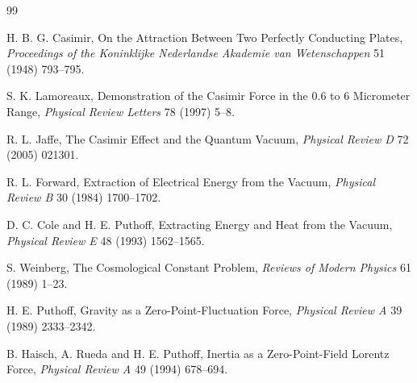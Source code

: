\documentclass[11pt]{article}
\begin{document}
\begin{thebibliography}{99}

 H. B. G. Casimir, On the Attraction Between Two Perfectly Conducting Plates, \emph{Proceedings of the Koninklijke Nederlandse Akademie van Wetenschappen} 51 (1948) 793--795.

 S. K. Lamoreaux, Demonstration of the Casimir Force in the 0.6 to 6 Micrometer Range, \emph{Physical Review Letters} 78 (1997) 5--8.

 R. L. Jaffe, The Casimir Effect and the Quantum Vacuum, \emph{Physical Review D} 72 (2005) 021301.

 R. L. Forward, Extraction of Electrical Energy from the Vacuum, \emph{Physical Review B} 30 (1984) 1700--1702.

 D. C. Cole and H. E. Puthoff, Extracting Energy and Heat from the Vacuum, \emph{Physical Review E} 48 (1993) 1562--1565.

 S. Weinberg, The Cosmological Constant Problem, \emph{Reviews of Modern Physics} 61 (1989) 1--23.

 H. E. Puthoff, Gravity as a Zero-Point-Fluctuation Force, \emph{Physical Review A} 39 (1989) 2333--2342.

 B. Haisch, A. Rueda and H. E. Puthoff, Inertia as a Zero-Point-Field Lorentz Force, \emph{Physical Review A} 49 (1994) 678--694.

\end{thebibliography}
\end{document}

